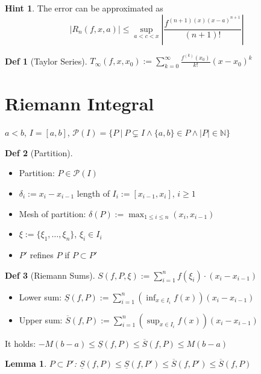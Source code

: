 \documentclass[a4paper, 10pt]{article}
\newtheorem*{lemma}{Lemma}
\theoremstyle{definition}
\newtheorem*{definition}{Def}
\newtheorem*{note_wrapper}{Hint}
\theoremstyle{named}
\newenvironment{note}%
    {\begin{mdframed}[style=trick]\begin{note_wrapper}}%
    {\end{note_wrapper}\end{mdframed}}
\newcommand{\N}{\mathbb{N}}
\begin{document}
\begin{note}
    The error can be approximated as
    $$|R_n(f, x, a)| \leq \sup_{a < c < x}\left|\frac{f^{(n + 1)(x)(x-a)^{n+1}}}{(n+1)!}\right|$$
\end{note}

\begin{definition}[Taylor Series]
    $T_\infty(f, x, x_0) := \sum_{k = 0}^\infty \frac{f^{(k)}(x_0)}{k!}(x-x_0)^k$
\end{definition}

\section{Riemann Integral}
\begin{center}
    $a < b$, $I = [a, b]$, $\mathcal{P}(I) = \{P \ | \ P \subsetneq I \land \{a, b\} \in P \land |P| \in \N \}$
\end{center}
\begin{definition}[Partition]
    \begin{itemize}
        \item Partition:  $P \in \mathcal{P}(I)$
        \item $\delta_i := x_i - x_{i-1}$ length of $I_i := [x_{i-1}, x_i]$, $i \geq 1$
        \item Mesh of partition: $\delta(P) := \max_{1 \leq i \leq n}(x_i, x_{i - 1})$
        \item $\xi := \{\xi_1, \ldots, \xi_n\}$, $\xi_i \in I_i$
        \item $P'$ refines $P$ if $P \subset P'$
    \end{itemize}
\end{definition}

\begin{definition}[Riemann Sums]
    $S(f, P, \xi) := \sum_{i = 1}^n f(\xi_i) \cdot (x_i - x_{i - 1})$
    \begin{itemize}
        \item Lower sum: $\underline{S}(f, P) := \sum_{i = 1}^n (\inf_{x \in I_i} f(x)) (x_i - x_{i - 1})$
        \item Upper sum: $\overline{S}(f, P) := \sum_{i = 1}^n (\sup_{x \in I_i} f(x)) (x_i - x_{i - 1})$
    \end{itemize}
    It holds: $-M(b - a) \leq \underline{S}(f, P) \leq \overline{S}(f, P) \leq M(b - a)$
\end{definition}

\begin{lemma}
    $P \subset P'$: $\underline{S}(f, P) \leq \underline{S}(f, P') \leq \overline{S}(f, P') \leq \overline{S}(f, P)$
\end{lemma}
\end{document}
